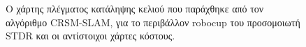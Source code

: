 \begin{figure}[!ht]
	\centering
	\caption{Ο χάρτης πλέγματος κατάληψης κελιού που παράχθηκε από τον αλγόριθμο CRSM-SLAM, για το περιβάλλον robocup του προσομοιωτή STDR και οι αντίστοιχοι χάρτες κόστους.}
	\label{fig:costmaps}
\end{figure}



